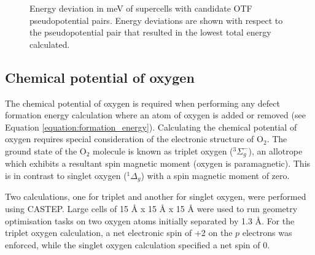\begin{figure}[ht] %
  \begin{center}
    \caption{Energy deviation in meV of supercells with candidate OTF pseudopotential pairs. Energy deviations are shown with respect to the pseudopotential pair that resulted in the lowest total energy calculated.}
    \label{Figure:otf_pp_test}
  \end{center}
\end{figure}

\subsection{Chemical potential of oxygen}

The chemical potential of oxygen is required when performing any defect formation energy calculation where an atom of oxygen is added or removed (see Equation \ref{equation:formation_energy}). Calculating the chemical potential of oxygen requires special consideration of the electronic structure of O$_{2}$. The ground state of the O$_{2}$ molecule is known as triplet oxygen ($^{3}\Sigma^{-}_{g}$), an allotrope which exhibits a resultant spin magnetic moment (oxygen is paramagnetic). This is in contrast to singlet oxygen ($^{1}\Delta_{g}$) with a spin magnetic moment of zero. 

Two calculations, one for triplet and another for singlet oxygen, were performed using CASTEP. Large cells of 15 \r{A} x 15 \r{A} x 15 \r{A} were used to run geometry optimisation tasks on two oxygen atoms initially separated by 1.3 \r{A}. For the triplet oxygen calculation, a net electronic spin of +2 on the $p$ electrons was enforced, while the singlet oxygen calculation specified a net spin of 0.

